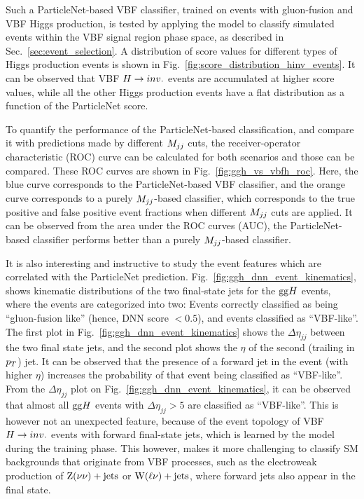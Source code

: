 Such a ParticleNet-based VBF classifier, trained on events with gluon-fusion and VBF Higgs production,
is tested by applying the model to classify simulated events within the VBF signal region phase space,
as described in Sec.~\ref{sec:event_selection}. A distribution of score values for different types of Higgs production events is shown in
Fig.~\ref{fig:score_distribution_hinv_events}. It can be observed that VBF $H \rightarrow inv.$ events are accumulated at higher score values, while all the
other Higgs production events have a flat distribution as a function of the ParticleNet score.

To quantify the performance of the ParticleNet-based classification, and compare it with predictions made by different $M_{jj}$ cuts, the
receiver-operator characteristic (ROC) curve can be calculated for both scenarios and those can be compared. These ROC curves are shown in
Fig.~\ref{fig:ggh_vs_vbfh_roc}. Here, the blue curve corresponds to the ParticleNet-based VBF classifier, and the orange curve corresponds
to a purely $M_{jj}$-based classifier, which corresponds to the true positive and false
positive event fractions when different $M_{jj}$ cuts are applied. It can be observed from the area under the ROC curves (AUC), the ParticleNet-based 
classifier performs better than a purely $M_{jj}$-based classifier.

It is also interesting and instructive to study the event features which are correlated with the ParticleNet prediction. Fig.~\ref{fig:ggh_dnn_event_kinematics},
shows kinematic distributions of the two final-state jets for the $\mathrm{gg}H$ events, where the events are categorized into two: Events correctly classified as
being ``gluon-fusion like'' (hence, DNN score $<0.5$), and events classified as ``VBF-like''. The first plot in Fig.~\ref{fig:ggh_dnn_event_kinematics}
shows the $\Delta\eta_{jj}$ between the two final state jets, and the second plot shows the $\eta$ of the second (trailing in $p_T$) jet. 
It can be observed that the presence of a forward jet in the event (with higher $\eta$) increases the probability of that event being classified as ``VBF-like''.
From the $\Delta\eta_{jj}$ plot on Fig.~\ref{fig:ggh_dnn_event_kinematics}, it can be observed that almost all $\mathrm{gg}H$ events with $\Delta\eta_{jj} > 5$ are
classified as ``VBF-like''. This is however not an unexpected feature, because of the event topology of VBF $H \rightarrow inv.$ events with forward final-state jets,
which is learned by the model during the training phase. This however, makes it more challenging to classify SM backgrounds that originate from VBF processes,
such as the electroweak production of $\mathrm{Z}(\nu\nu)+\textrm{jets}$ or $\mathrm{W}(\ell\nu)+\textrm{jets}$, where forward jets also appear in the final state.

